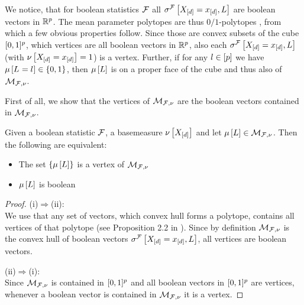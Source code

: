 We notice, that for boolean statistics $\mathcal{F}$ all $\sigma^{\mathcal{F}}\left[X_{[d]}=x_{[d]},L\right]$ are boolean vectors in $\mathbb{R}^{p}$.
The mean parameter polytopes are thus $0/1$-polytopes \cite{ziegler_lectures_2000,gillmann_01-polytopes_2007}, from which a few obvious properties follow.
Since those are convex subsets of the cube $[0,1]^p$, which vertices are all boolean vectors in $\mathbb{R}^{p}$, also each $\sigma^{\mathcal{F}}\left[X_{[d]}=x_{[d]},L\right]$ (with $\nu\left[X_{[d]}=x_{[d]}\right]=1$) is a vertex.
Further, if for any $l\in[p]$ we have $\mu\left[L_{}=l_{}\right]\in\{0,1\}$, then $\mu\left[L\right]$ is on a proper face of the cube and thus also of $\mathcal{M}_{\mathcal{F},\nu}$.


First of all, we show that the vertices of $\mathcal{M}_{\mathcal{F},\nu}$ are the boolean vectors contained in $\mathcal{M}_{\mathcal{F},\nu}$.

\begin{theorem}\label{the:vertexByHardLogicNetworks}
    Given a boolean statistic $\mathcal{F}$, a basemeasure $\nu\left[X_{[d]}\right]$ and let $\mu\left[L\right]\in\mathcal{M}_{\mathcal{F},\nu}$.
    Then the following are equivalent:
    \begin{itemize}
        \item[(i)] The set $\{\mu\left[L\right]\}$ is a vertex of $\mathcal{M}_{\mathcal{F},\nu}$
        \item[(ii)] $\mu\left[L\right]$ is boolean
    \end{itemize}
\end{theorem}
\begin{proof}
    (i)$\Rightarrow$(ii): \\
    We use that any set of vectors, which convex hull forms a polytope, contains all vertices of that polytope (see Proposition 2.2 in \cite{ziegler_lectures_2013}).
    Since by definition $\mathcal{M}_{\mathcal{F},\nu}$ is the convex hull of boolean vectors $\sigma^{\mathcal{F}}\left[X_{[d]}=x_{[d]},L\right]$, all vertices are boolean vectors.

    (ii)$\Rightarrow$(i): \\
    Since $\mathcal{M}_{\mathcal{F},\nu}$ is contained in $[0,1]^{p}$ and all boolean vectors in $[0,1]^{p}$ are vertices, whenever a boolean vector is contained in $\mathcal{M}_{\mathcal{F},\nu}$ it is a vertex.
\end{proof}

